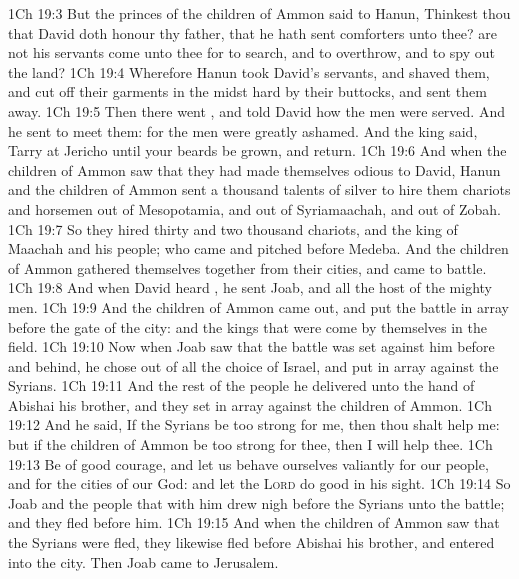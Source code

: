 \vs 1Ch 19:3 But the princes of the children of Ammon said to Hanun, Thinkest thou that David doth honour thy father, that he hath sent comforters unto thee? are not his servants come unto thee for to search, and to overthrow, and to spy out the land?
\vs 1Ch 19:4 Wherefore Hanun took David's servants, and shaved them, and cut off their garments in the midst hard by their buttocks, and sent them away.
\vs 1Ch 19:5 Then there went , and told David how the men were served. And he sent to meet them: for the men were greatly ashamed. And the king said, Tarry at Jericho until your beards be grown, and  return.
\vs 1Ch 19:6 And when the children of Ammon saw that they had made themselves odious to David, Hanun and the children of Ammon sent a thousand talents of silver to hire them chariots and horsemen out of Mesopotamia, and out of Syriamaachah, and out of Zobah.
\vs 1Ch 19:7 So they hired thirty and two thousand chariots, and the king of Maachah and his people; who came and pitched before Medeba. And the children of Ammon gathered themselves together from their cities, and came to battle.
\vs 1Ch 19:8 And when David heard , he sent Joab, and all the host of the mighty men.
\vs 1Ch 19:9 And the children of Ammon came out, and put the battle in array before the gate of the city: and the kings that were come  by themselves in the field.
\vs 1Ch 19:10 Now when Joab saw that the battle was set against him before and behind, he chose out of all the choice of Israel, and put  in array against the Syrians.
\vs 1Ch 19:11 And the rest of the people he delivered unto the hand of Abishai his brother, and they set  in array against the children of Ammon.
\vs 1Ch 19:12 And he said, If the Syrians be too strong for me, then thou shalt help me: but if the children of Ammon be too strong for thee, then I will help thee.
\vs 1Ch 19:13 Be of good courage, and let us behave ourselves valiantly for our people, and for the cities of our God: and let the \textsc{Lord} do  good in his sight.
\vs 1Ch 19:14 So Joab and the people that  with him drew nigh before the Syrians unto the battle; and they fled before him.
\vs 1Ch 19:15 And when the children of Ammon saw that the Syrians were fled, they likewise fled before Abishai his brother, and entered into the city. Then Joab came to Jerusalem.
